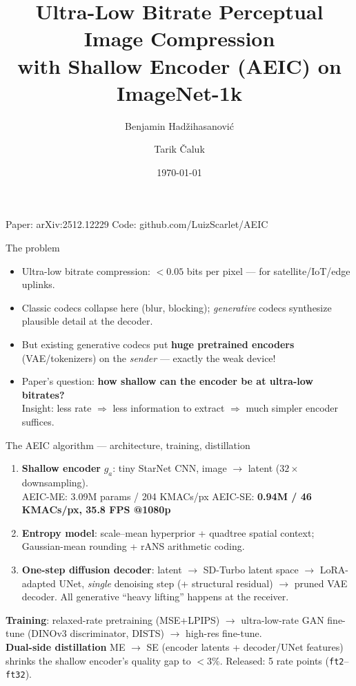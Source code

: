 \documentclass[aspectratio=169]{beamer}
\title[AEIC on ImageNet-1k]{Ultra-Low Bitrate Perceptual Image Compression\\with Shallow Encoder (AEIC) on ImageNet-1k}
\author{Benjamin Had\v{z}ihasanovi\'{c} \and Tarik \v{C}aluk}
\institute{Multimedia Systems — project (paper: Zhang, Liu, Chen, CVPR 2026)}
\date{\today}
\begin{document}
\begin{frame}
  \titlepage
  \centering\footnotesize
  Paper: arXiv:2512.12229 \quad Code: github.com/LuizScarlet/AEIC
\end{frame}

\begin{frame}{The problem}
  \begin{itemize}
    \item Ultra-low bitrate compression: $<0.05$ bits per pixel — for satellite/IoT/edge uplinks.
    \item Classic codecs collapse here (blur, blocking); \emph{generative} codecs synthesize
          plausible detail at the decoder.
    \item But existing generative codecs put \textbf{huge pretrained encoders} (VAE/tokenizers)
          on the \emph{sender} — exactly the weak device!
    \item Paper's question: \textbf{how shallow can the encoder be at ultra-low bitrates?}\\
          Insight: less rate $\Rightarrow$ less information to extract $\Rightarrow$ much simpler encoder suffices.
  \end{itemize}
\end{frame}

\begin{frame}{The AEIC algorithm — architecture, training, distillation}
  \begin{enumerate}
    \item \textbf{Shallow encoder} $g_a$: tiny StarNet CNN, image $\to$ latent ($32\times$ downsampling).\\
          AEIC-ME: 3.09M params / 204 KMACs/px \quad AEIC-SE: \textbf{0.94M / 46 KMACs/px, 35.8 FPS @1080p}
    \item \textbf{Entropy model}: scale--mean hyperprior + quadtree spatial context;\\
          Gaussian-mean rounding + rANS arithmetic coding.
    \item \textbf{One-step diffusion decoder}: latent $\to$ SD-Turbo latent space $\to$
          LoRA-adapted UNet, \emph{single} denoising step (+ structural residual) $\to$ pruned VAE
          decoder. All generative ``heavy lifting'' happens at the receiver.
  \end{enumerate}
  \medskip
  \textbf{Training}: relaxed-rate pretraining (MSE+LPIPS) $\to$ ultra-low-rate GAN fine-tune
  (DINOv3 discriminator, DISTS) $\to$ high-res fine-tune.\\
  \textbf{Dual-side distillation} ME $\to$ SE (encoder latents + decoder/UNet features) shrinks
  the shallow encoder's quality gap to $<3\%$. Released: 5 rate points (\texttt{ft2}--\texttt{ft32}).
\end{frame}
\end{document}
